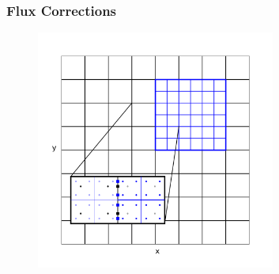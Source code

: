 \documentclass{beamer}
\begin{document}
\begin{frame}
\frametitle{Flux Corrections}

  \begin{figure}[htb!]
    \centering
    \includegraphics[width=0.7\textwidth]{fig.MeshRefinement_2D.png}
  \end{figure}

\end{frame}
\end{document}
